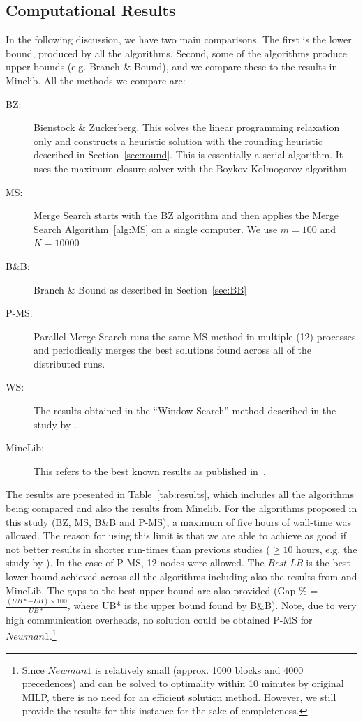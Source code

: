 \documentclass[authoryear,11pt,square,number,times,super,comma]{elsarticle}
\begin{document}
\subsection{Computational Results}\label{sec:ser_res}
In the following discussion, we have two main comparisons. The first is the lower bound, produced by all the algorithms. Second, some of the algorithms produce upper bounds (e.g. Branch \& Bound), and we compare these to the results in Minelib. All the methods we compare are:
\begin{description}
\item[BZ:] Bienstock \& Zuckerberg. This solves the linear programming
  relaxation only and constructs a heuristic solution with the rounding
  heuristic described in Section~\ref{sec:round}. This is essentially a
  serial algorithm. It uses the maximum closure solver with the
  Boykov-Kolmogorov algorithm.
\item[MS:] Merge Search starts with the BZ algorithm and then applies the
  Merge Search Algorithm~\ref{alg:MS} on a single computer. We use $m=100$ and
  $K=10000$ 
\item[B\&B:] Branch \& Bound as described in Section~\ref{sec:BB}
\item[P-MS:] Parallel Merge Search runs the same MS method in multiple (12)
  processes and periodically merges the best solutions found across all of the
  distributed runs. 
\item[WS:] The results obtained in the ``Window Search'' method described in the study by \citet{Kenny:2017}.
\item[MineLib:] This refers to the best known results as published
  in~\cite{espinoza_minelib:_2012}.
\end{description}

The results are presented in Table~\ref{tab:results}, which includes all the algorithms being compared and also the results from Minelib. For the algorithms proposed in this study (BZ, MS, B\&B and P-MS), a maximum of five hours of wall-time was allowed. The reason for using this limit is that we are able to achieve as good if not better results in shorter run-times than previous studies ($\geq 10$ hours, e.g. the study by \citet{Kenny:2017}). In the case of P-MS, 12 nodes were allowed. The {\it Best LB} is the best lower bound achieved across all the algorithms including also the results from \citet{Kenny:2017} and MineLib. The gaps to the best upper bound are also provided (Gap $\%$  = $\frac{(UB*-LB) \times 100}{UB*}$, where UB* is the upper bound found by B$\&$B). Note, due to very high communication overheads, no solution could be obtained P-MS for $Newman1$.\footnote{Since $Newman1$ is relatively small (approx. 1000 blocks and 4000 precedences) and can be solved to optimality within 10 minutes by original MILP, there is no need for an efficient solution method. However, we still provide the results for this instance for the sake of completeness.} 
\end{document}
